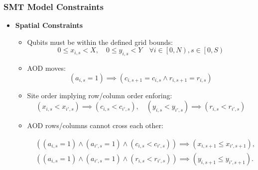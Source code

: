 \documentclass[18 pt]{beamer}
\begin{document}
\begin{frame}
    \frametitle{SMT Model Constraints}
    \begin{itemize}
        \item \textbf{Spatial Constraints}
        \begin{itemize}
            \item Qubits must be within the defined grid bounds:
            \[
            0 \leq x_{i,s} < X, \quad 0 \leq y_{i,s} < Y \quad \forall i\in \left[0,N \right), s \in \left[0,S\right)
            \]
            \item AOD moves:
            \[(a_{i,s}=1)\implies (c_{i,s+1}=c_{i,s}\land r_{i,s+1}=r_{i,s})\]
            \item Site order implying row/column order enforing:
            \[(x_{i,s}<x_{i',s})\implies (c_{i,s}<c_{i',s}),\quad (y_{i,s}<y_{i',s})\implies (r_{i,s}<r_{i',s})
            \] 
            \item AOD rows/columns cannot cross each other:
            \begin{small}
                \begin{align*}
                &((a_{i,s} = 1) \land (a_{i',s} = 1) \land (c_{i,s} < c_{i',s})) \implies (x_{i,s+1} \leq x_{i',s+1}), \\
                &((a_{i,s} = 1) \land (a_{i',s} = 1) \land (r_{i,s} < r_{i',s})) \implies (y_{i,s+1} \leq y_{i',s+1}).
                \end{align*}
            \end{small}
        \end{itemize}
    \end{itemize}
\end{frame}
\end{document}
